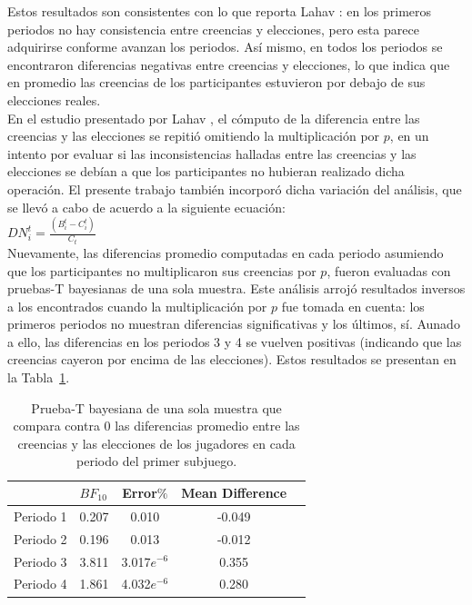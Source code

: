 Estos resultados son consistentes con lo que reporta Lahav \parencite*{Lahav2015}: en los primeros periodos no hay consistencia entre creencias y elecciones, pero esta parece adquirirse conforme avanzan los periodos. Así mismo, en todos los periodos se encontraron diferencias negativas entre creencias y elecciones, lo que indica que en promedio las creencias de los participantes estuvieron por debajo de sus elecciones reales.\\

En el estudio presentado por Lahav \parencite*{Lahav2015}, el cómputo de la diferencia entre las creencias y las elecciones se repitió omitiendo la multiplicación por $p$, en un intento por evaluar si las inconsistencias halladas entre las creencias y las elecciones se debían a que los participantes no hubieran realizado dicha operación. El presente trabajo también incorporó dicha variación del análisis, que se llevó a cabo de acuerdo a la siguiente ecuación:\\

$DN_i^t = \frac{(B_i^t - C_i^t)}{C_t}$\\

Nuevamente, las diferencias promedio computadas en cada periodo asumiendo que los participantes no multiplicaron sus creencias por $p$, fueron evaluadas con pruebas-T bayesianas de una sola muestra.  Este análisis arrojó resultados inversos a los encontrados cuando la multiplicación por $p$ fue tomada en cuenta: los primeros periodos no muestran diferencias significativas y los últimos, sí.  Aunado a ello, las diferencias en los periodos 3 y 4 se vuelven positivas (indicando que las creencias cayeron por encima de las elecciones). Estos resultados se presentan en la Tabla~\ref{DN_Sub1_noP}.

\begin{table}
\caption[Diferencias Normalizadas en el Subjuego 1 (sin multiplicación por $p$)]{Prueba-T bayesiana de una sola muestra que compara contra 0 las diferencias promedio entre las creencias y las elecciones de los jugadores en cada periodo del primer subjuego.}
\label{DN_Sub1_noP}
\centering
\begin{tabular}{l l | c c c}  %
\toprule
\textbf{} & \textbf{$BF_{10}$} & \textbf{Error$\%$} & \textbf{Mean Difference}\\
\midrule
Periodo 1 & 0.207 & 0.010 & -0.049 \\
Periodo 2 & 0.196 & 0.013 & -0.012 \\
Periodo 3 & 3.811 & 3.017$e^{-6}$ & 0.355 \\
Periodo 4 & 1.861 & 4.032$e^{-6}$ & 0.280 \\
\bottomrule
\end{tabular}
\end{table}

